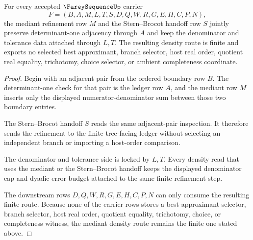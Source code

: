 \begin{theorem}
\label{thm:farey-sequence-stern-brocot-mediant-density-route}
For every accepted $\FareySequenceUp$ carrier
$$
F=(B,A,M,L,T,S,D,Q,W,R,G,E,H,C,P,N),
$$
the mediant refinement row $M$ and the Stern--Brocot handoff row $S$ jointly preserve determinant-one adjacency through $A$ and keep the denominator and tolerance data attached through $L,T$. The resulting density route is finite and exports no selected best approximant, branch selector, host real order, quotient real equality, trichotomy, choice selector, or ambient completeness coordinate.
\end{theorem}
\begin{proof}
Begin with an adjacent pair from the ordered boundary row $B$. The determinant-one check for that pair is the ledger row $A$, and the mediant row $M$ inserts only the displayed numerator-denominator sum between those two boundary entries.

The Stern--Brocot handoff $S$ reads the same adjacent-pair inspection. It therefore sends the refinement to the finite tree-facing ledger without selecting an independent branch or importing a host-order comparison.

The denominator and tolerance side is locked by $L,T$. Every density read that uses the mediant or the Stern--Brocot handoff keeps the displayed denominator cap and dyadic error budget attached to the same finite refinement step.

The downstream rows $D,Q,W,R,G,E,H,C,P,N$ can only consume the resulting finite route. Because none of the carrier rows stores a best-approximant selector, branch selector, host real order, quotient equality, trichotomy, choice, or completeness witness, the mediant density route remains the finite one stated above.
\end{proof}

